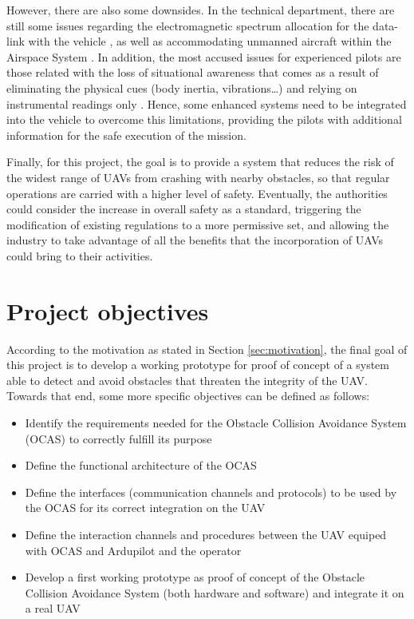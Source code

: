 However, there are also some downsides.
In the technical department, there are still some issues regarding the electromagnetic spectrum allocation for the data-link with the vehicle \cite{civilianunmannedaerialvehiclesreadyfortakeoff2012}, as well as accommodating unmanned aircraft within the Airspace System \cite{unmannedaircraftsystemsperceptionsandpotentials2013}.
In addition, the most accused issues for experienced pilots are those related with the loss of situational awareness that comes as a result of eliminating the physical cues (body inertia, vibrations\ldots) and relying on instrumental readings only \cite{bergqvist2014}.
Hence, some enhanced systems need to be integrated into the vehicle to overcome this limitations, providing the pilots with additional information for the safe execution of the mission.

Finally, for this project, the goal is to provide a system that reduces the risk of the widest range of UAVs from crashing with nearby obstacles, so that regular operations are carried with a higher level of safety.
Eventually, the authorities could consider the increase in overall safety as a standard, triggering the modification of existing regulations to a more permissive set, and allowing the industry to take advantage of all the benefits that the incorporation of UAVs could bring to their activities.

\section{Project objectives} \label{sec:objectives}

According to the motivation as stated in Section \ref{sec:motivation}, the final goal of this project is to develop a working prototype for proof of concept of a system able to detect and avoid obstacles that threaten the integrity of the UAV. Towards that end, some more specific objectives can be defined as follows:
\begin{itemize}
	\item Identify the requirements needed for the Obstacle Collision Avoidance System (OCAS) to correctly fulfill its purpose
	\item Define the functional architecture of the OCAS
	\item Define the interfaces (communication channels and protocols) to be used by the OCAS for its correct integration on the UAV
	\item Define the interaction channels and procedures between the UAV equiped with OCAS and Ardupilot and the operator
	\item Develop a first working prototype as proof of concept of the Obstacle Collision Avoidance System (both hardware and software) and integrate it on a real UAV
\end{itemize}

